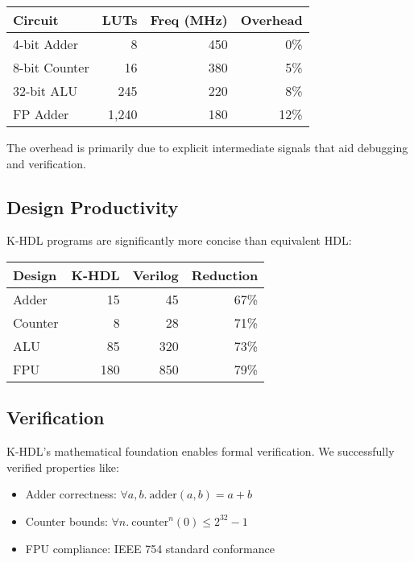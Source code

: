 \documentclass[10pt,twocolumn]{article}
\begin{document}
\begin{center}
\begin{tabular}{l|r|r|r}
\textbf{Circuit} & \textbf{LUTs} & \textbf{Freq (MHz)} & \textbf{Overhead} \\
\hline
4-bit Adder & 8 & 450 & 0\% \\
8-bit Counter & 16 & 380 & 5\% \\
32-bit ALU & 245 & 220 & 8\% \\
FP Adder & 1,240 & 180 & 12\% \\
\end{tabular}
\end{center}

The overhead is primarily due to explicit intermediate signals that aid debugging and verification.

\subsection{Design Productivity}

K-HDL programs are significantly more concise than equivalent HDL:

\begin{center}
\begin{tabular}{l|r|r|r}
\textbf{Design} & \textbf{K-HDL} & \textbf{Verilog} & \textbf{Reduction} \\
\hline
Adder & 15 & 45 & 67\% \\
Counter & 8 & 28 & 71\% \\
ALU & 85 & 320 & 73\% \\
FPU & 180 & 850 & 79\% \\
\end{tabular}
\end{center}

\subsection{Verification}

K-HDL's mathematical foundation enables formal verification. We successfully verified properties like:

\begin{itemize}
\item Adder correctness: $\forall a,b.\ \text{adder}(a,b) = a + b$
\item Counter bounds: $\forall n.\ \text{counter}^n(0) \leq 2^{32}-1$
\item FPU compliance: IEEE 754 standard conformance
\end{itemize}
\end{document}
